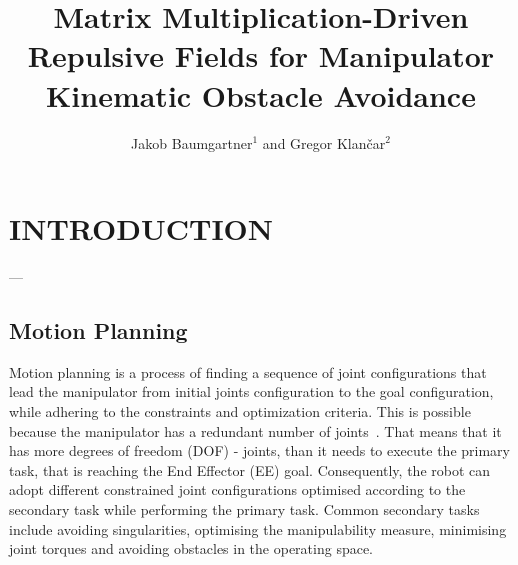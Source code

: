 \documentclass[letterpaper, 10 pt, conference]{ieeeconf}  %
\title{\LARGE \bf
Matrix Multiplication-Driven Repulsive Fields for Manipulator Kinematic Obstacle Avoidance
}
\author{
	Jakob Baumgartner$^{1}$ and Gregor Klančar$^{2}$%
}
\begin{document}
\maketitle
\thispagestyle{empty}
\pagestyle{empty}


\begin{abstract}



\end{abstract}



\section{INTRODUCTION}

%

\alert{---}

\subsection{Motion Planning}

Motion planning is a process of finding a sequence of joint configurations that lead the manipulator from initial joints configuration to the goal configuration, while adhering to the constraints and optimization criteria. This is possible because the manipulator has a redundant number of joints~\cite{siciliano1990kinematic}. That means that it has more degrees of freedom (DOF) - joints, than it needs to execute the primary task, that is reaching the End Effector (EE) goal. Consequently, the robot can adopt different constrained joint configurations optimised according to the secondary task while performing the primary task. Common secondary tasks~\cite{siciliano2010robot} include avoiding singularities, optimising the manipulability measure, minimising joint torques and avoiding obstacles in the operating space.
\end{document}
